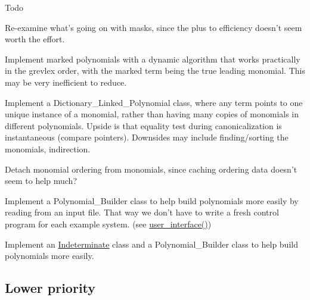 \begin{DoxyRefDesc}{Todo}
\begin{DoxyItemize}
\item Re-\/examine what's going on with masks, since the plus to efficiency doesn't seem worth the effort.
\item Implement marked polynomials with a dynamic algorithm that works practically in the grevlex order, with the marked term being the true leading monomial. This may be very inefficient to reduce.
\item Implement a {\ttfamily Dictionary\+\_\+\+Linked\+\_\+\+Polynomial} class, where any term points to one unique instance of a monomial, rather than having many copies of monomials in different polynomials. Upside is that equality test during canonicalization is instantaneous (compare pointers). Downsides may include finding/sorting the monomials, indirection.
\item Detach monomial ordering from monomials, since caching ordering data doesn't seem to help much?
\item Implement a {\ttfamily Polynomial\+\_\+\+Builder} class to help build polynomials more easily by reading from an input file. That way we don't have to write a fresh control program for each example system. (see \hyperlink{group__utils_ga72d205e8226d578b892515edc527cc83}{user\+\_\+interface()})
\item Implement an \hyperlink{group__polygroup_class_indeterminate}{Indeterminate} class and a {\ttfamily Polynomial\+\_\+\+Builder} class to help build polynomials more easily.
\end{DoxyItemize}\end{DoxyRefDesc}
\hypertarget{index_lopri}{}\subsection{Lower priority}\label{index_lopri}
